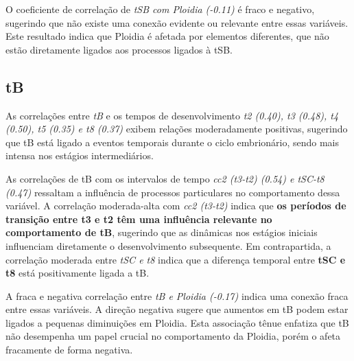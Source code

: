 O coeficiente de correlação de \textit{tSB com Ploidia (-0.11)} é fraco e negativo, sugerindo que não existe uma conexão evidente ou relevante entre essas variáveis. Este resultado indica que Ploidia é afetada por elementos diferentes, que não estão diretamente ligados aos processos ligados à tSB.

\subsection*{tB}
As correlações entre \textit{tB} e os tempos de desenvolvimento \textit{t2 (0.40), t3 (0.48), t4 (0.50), t5 (0.35) e t8 (0.37)} exibem relações moderadamente positivas, sugerindo que tB está ligado a eventos temporais durante o ciclo embrionário, sendo mais intensa nos estágios intermediários. 

As correlações de tB com os intervalos de tempo \textit{cc2 (t3-t2) (0.54) e tSC-t8 (0.47)} ressaltam a influência de processos particulares no comportamento dessa variável. A correlação moderada-alta com \textit{cc2 (t3-t2)} indica que \textbf{os períodos de transição entre t3 e t2 têm uma influência relevante no comportamento de tB}, sugerindo que as dinâmicas nos estágios iniciais influenciam diretamente o desenvolvimento subsequente. Em contrapartida, a correlação moderada entre \textit{tSC e t8} indica que a diferença temporal entre \textbf{tSC e t8} está positivamente ligada a tB. 

A fraca e negativa correlação entre \textit{tB e Ploidia (-0.17)} indica uma conexão fraca entre essas variáveis. A direção negativa sugere que aumentos em tB podem estar ligados a pequenas diminuições em Ploidia. Esta associação tênue enfatiza que tB não desempenha um papel crucial no comportamento da Ploidia, porém o afeta fracamente de forma negativa.

